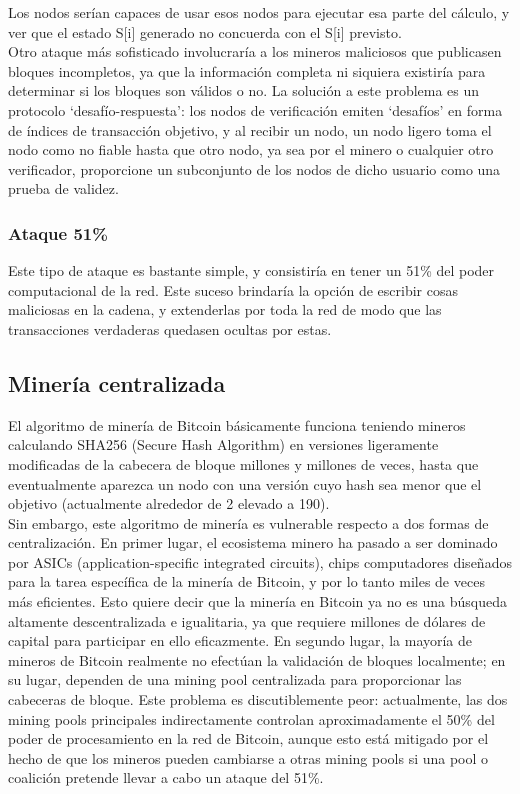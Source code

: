 \documentclass[11pt,a4paper]{article}
\begin{document}
Los nodos serían capaces de usar esos nodos para ejecutar esa parte del cálculo, y ver que el estado S[i] generado no concuerda con el S[i] previsto.\\ 

Otro ataque más sofisticado involucraría a los mineros maliciosos que publicasen bloques
incompletos, ya que la información completa ni siquiera existiría para determinar si los bloques son válidos o no. La solución a este problema es un protocolo ‘desafío-respuesta’: los nodos de verificación emiten ‘desafíos’ en forma de índices de transacción objetivo, y al recibir un nodo, un nodo ligero toma el nodo como no fiable hasta que otro nodo, ya sea por el minero o cualquier otro verificador, proporcione un subconjunto de los nodos de dicho usuario como una prueba de validez.

\subsubsection{Ataque 51\%}

Este tipo de ataque es bastante simple, y consistiría en tener un 51\% del poder computacional de la red. Este suceso brindaría la opción de escribir cosas maliciosas en la cadena, y extenderlas por toda la red de modo que las transacciones verdaderas quedasen ocultas por estas.


\subsection{Minería centralizada}
El algoritmo de minería de Bitcoin básicamente funciona teniendo mineros calculando SHA256 (Secure Hash Algorithm) en versiones ligeramente modificadas de la cabecera de bloque millones y millones de veces, hasta que eventualmente aparezca un nodo con una versión cuyo hash sea menor que el objetivo (actualmente alrededor de 2 elevado a 190).\\

Sin embargo, este algoritmo de minería es vulnerable respecto a dos formas de centralización. En primer lugar, el ecosistema minero ha pasado a ser dominado por ASICs (application-specific integrated circuits), chips computadores diseñados para la tarea específica de la minería de Bitcoin, y por lo tanto miles de veces más eficientes. Esto quiere decir que la minería en Bitcoin ya no es una búsqueda altamente descentralizada e igualitaria, ya que requiere millones de dólares de capital para participar en ello eficazmente. En segundo lugar, la mayoría de mineros de Bitcoin realmente no efectúan la validación de bloques localmente; en su lugar, dependen de una mining pool centralizada para proporcionar las cabeceras de bloque. Este problema es discutiblemente peor: actualmente, las dos mining pools principales indirectamente controlan aproximadamente el 50\% del poder de procesamiento en la red de Bitcoin, aunque esto está mitigado por el hecho de que los mineros pueden cambiarse a otras mining pools si una pool o coalición pretende llevar a cabo un ataque del 51\%.\\
\end{document}
